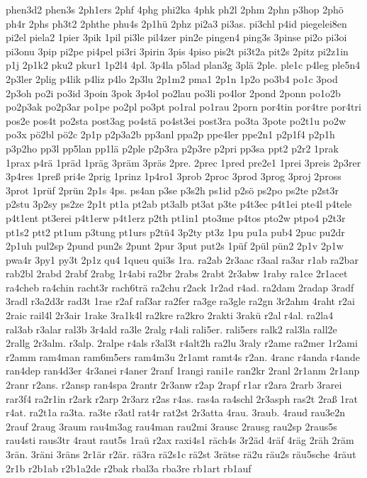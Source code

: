 {phen3d2
phen3s
2ph1ers
2phf
4phg
phi2ka
4phk
ph2l
2phm
2phn
p3hop
2phö
ph4r
2phs
ph3t2
2phthe
phu4s
2p1hü
2phz
pi2a3
pi3as.
pi3chl
p4id
piegelei8en
pi2el
piela2
1pier
3pik
1pil
pi3le
pil4zer
pin2e
pingen4
ping3s
3pinse
pi2o
pi3oi
pi3onu
3pip
pi2pe
pi4pel
pi3ri
3pirin
3pis
4piso
pis2t
pi3t2a
pit2s
2pitz
pi2z1in
p1j
2p1k2
pku2
pkur1
1p2l4
4pl.
3p4la
p5lad
plan3g
3plä
2ple.
ple1c
p4leg
ple5n4
2p3ler
2plig
p4lik
p4liz
p4lo
2p3lu
2p1m2
pma1
2p1n
1p2o
po3b4
po1c
3pod
2p3oh
po2i
po3id
3poin
3pok
3p4ol
po2lau
po3li
po4lor
2pond
2ponn
po1o2b
po2p3ak
po2p3ar
po1pe
po2pl
po3pt
po1ral
po1rau
2porn
por4tin
por4tre
por4tri
pos2e
pos4t
po2sta
post3ag
po4stä
po4st3ei
post3ra
po3ta
3pote
po2t1u
po2w
po3x
pö2bl
pö2c
2p1p
p2p3a2b
pp3anl
ppa2p
ppe4ler
ppe2n1
p2p1f4
p2p1h
p3p2ho
pp3l
pp5lan
pp1lä
p2ple
p2p3ra
p2p3re
p2pri
pp3sa
ppt2
p2r2
1prak
1prax
p4rä
1präd
1präg
3präm
3präs
2pre.
2prec
1pred
pre2e1
1prei
3preis
2p3rer
3p4res
1preß
pri4e
2prig
1prinz
1p4ro1
3prob
2proc
3prod
3prog
3proj
2pross
3prot
1prüf
2prün
2p1s
4ps.
ps4an
p3se
p3s2h
ps1id
p2sö
ps2po
ps2te
p2st3r
p2stu
3p2sy
ps2ze
2p1t
pt1a
pt2ab
pt3alb
pt3at
p3te
p4t3ec
p4t1ei
pte4l
p4tele
p4t1ent
pt3erei
p4t1erw
p4t1erz
p2th
pt1in1
pto3me
p4tos
pto2w
ptpo4
p2t3r
pt1s2
ptt2
pt1um
p3tung
pt1urs
p2tü4
3p2ty
pt3z
1pu
pu1a
pub4
2puc
pu2dr
2p1uh
pul2sp
2pund
pun2s
2punt
2pur
3put
put2s
1püf
2pül
pün2
2p1v
2p1w
pwa4r
3py1
py3t
2p1z
qu4
1queu
qui3s
1ra.
ra2ab
2r3aac
r3aal
ra3ar
r1ab
ra2bar
rab2bl
2rabd
2rabf
2rabg
1r4abi
ra2br
2rabs
2rabt
2r3abw
1raby
ra1ce
2r1acet
ra4cheb
ra4chin
racht3r
rach6trä
ra2chu
r2ack
1r2ad
r4ad.
ra2dam
2radap
3radf
3radl
r3a2d3r
rad3t
1rae
r2af
raf3ar
ra2fer
ra3ge
ra3gle
ra2gn
3r2ahm
4raht
r2ai
2raic
rail4l
2r3air
1rake
3ra1k4l
ra2kre
ra2kro
2rakti
3rakü
r2al
r4al.
ra2la4
ral3ab
r3alar
ral3b
3r4ald
ra3le
2ralg
r4ali
rali5er.
rali5ers
ralk2
ral3la
rall2e
2rallg
2r3alm.
r3alp.
2ralpe
r4als
r3al3t
r4alt2h
ra2lu
3raly
r2ame
ra2mer
1r2ami
r2amm
ram4man
ram6m5ers
ram4m3u
2r1amt
ramt4s
r2an.
4ranc
r4anda
r4ande
ran4dep
ran4d3er
4r3anei
r4aner
2ranf
1rangi
rani1e
ran2kr
2ranl
2r1anm
2r1anp
2ranr
r2ans.
r2ansp
ran4spa
2rantr
2r3anw
r2ap
2rapf
r1ar
r2ara
2rarb
3rarei
rar3f4
ra2r1in
r2ark
r2arp
2r3arz
r2as
r4as.
ras4a
ra4schl
2r3asph
ras2t
2raß
1rat
r4at.
ra2t1a
ra3ta.
ra3te
r3atl
rat4r
rat2st
2r3atta
4rau.
3raub.
4raud
rau3e2n
2rauf
2raug
3raum
rau4m3ag
rau4man
rau2mi
3rausc
2rausg
rau2sp
2raus5s
rau4sti
raus3tr
4raut
raut5s
1raü
r2ax
raxi4s1
räch4s
3r2äd
4räf
4räg
2räh
2räm
3rän.
3räni
3räns
2r1är
r2är.
rä3ra
rä2s1c
rä2st
3rätse
rä2u
räu2s
räu5sche
4räut
2r1b
r2b1ab
r2b1a2de
r2bak
rbal3a
rba3re
rb1art
rb1auf
}
